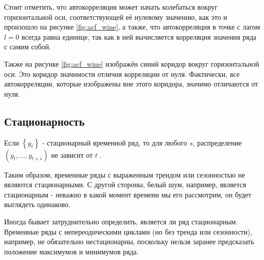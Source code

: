 Стоит отметить, что автокорреляция может начать колебаться вокруг горизонтальной оси, 
соответствующей её нулевому значению, как это и произошло на рисунке \ref{fig:acf_wine}, 
а также, что автокорреляция в точке с лагом $l = 0$ всегда равна единице, 
так как в ней вычисляется корреляция значения ряда с самим собой.

Также на рисунке \ref{fig:acf_wine} изображён синий коридор вокруг горизонтальной оси. 
Это коридор значимости отличия корреляции от нуля. Фактически, все автокорреляции, 
которые изображены вне этого коридора, значимо отличаются от нуля.

\subsection{Стационарность}

Если $\left\{y_t\right\}$ - стационарный временной ряд, то 
для любого $s$, распределение $(y_t, \dots, y_{t+s})$ не зависит 
от $t$ \cite{Forecasting_Hyndman}. 

Таким образом, временные ряды с выраженным трендом или сезонностью не являются стационарными.
С другой стороны, белый шум, например, является стационарным - неважно в какой момент времени 
мы его рассмотрим, он будет выглядеть одинаково.

Иногда бывает затруднительно определить, является ли ряд стационарным. Временные ряды с 
непереодическими циклами (но без тренда или сезонности), например, не обязательно нестационарны, поскольку 
нельзя заранее предсказать положение максимумов и минимумов ряда.

